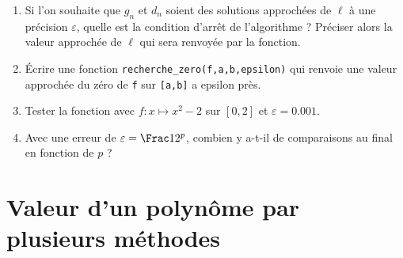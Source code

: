 \bigskip

\begin{enumerate}
	
	\item Si l'on souhaite que $g_n$ et $d_n$ soient des solutions approchées de $\ell$ à une précision $\varepsilon$, quelle est la condition d'arrêt de l'algorithme ? Préciser alors la valeur approchée de $\ell$ qui sera renvoyée par la fonction.
	
	\item \'Ecrire une fonction \texttt{recherche\_zero(f,a,b,epsilon)} qui renvoie une valeur approchée du zéro de \texttt{f} sur \texttt{[a,b]} a epsilon près.
	
	\item Tester la fonction avec $f:x\mapsto x^2-2$ sur $[0,2]$ et $\varepsilon=0.001$.
	
	\item Avec une erreur de $\varepsilon=\Frac 1{2^p}$, combien y a-t-il de comparaisons au final en fonction de $p$ ?
	
	
\end{enumerate}

\ee

\section{Valeur d'un polynôme par plusieurs méthodes}

